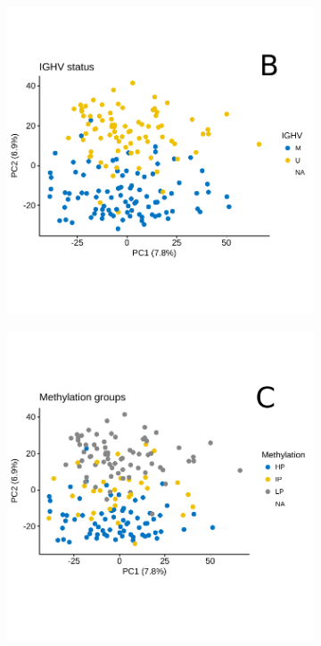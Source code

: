 \begin{figure}
\begin{subfigure}[t]{0.45\columnwidth}
		\includegraphics[width=\columnwidth]{./Figures/pca_ighv_test.pdf}
		\subcaption*{}
		\label{fig:pca_IGHV}
	\end{subfigure}
	\quad
	\begin{subfigure}[t]{0.45\columnwidth}
		\includegraphics[width=\columnwidth]{./Figures/pca_Methylation.pdf}

\end{subfigure}
\end{figure}
